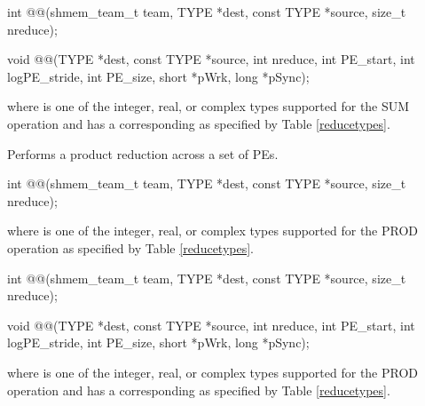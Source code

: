 \begin{apidefinition}
\begin{Csynopsis}
\end{Csynopsis}

\begin{CsynopsisCol}
int @@(shmem_team_t team, TYPE *dest, const TYPE *source, size_t nreduce);
\end{CsynopsisCol}

\begin{DeprecateBlock}
\begin{CsynopsisCol}
void @@(TYPE *dest, const TYPE *source, int nreduce, int PE_start, int logPE_stride, int PE_size, short *pWrk, long *pSync);
\end{CsynopsisCol}
\end{DeprecateBlock}
where \TYPE{} is one of the integer, real, or complex types supported for the SUM operation and has a corresponding \TYPENAME{} as specified by Table \ref{reducetypes}.

Performs a product reduction across a set of \acp{PE}.\newline

\begin{C11synopsis}
int @@(shmem_team_t team, TYPE *dest, const TYPE *source, size_t nreduce);
\end{C11synopsis}
where \TYPE{} is one of the integer, real, or complex types supported for the PROD operation as specified by Table \ref{reducetypes}.

\begin{Csynopsis}
\end{Csynopsis}

\begin{CsynopsisCol}
int @@(shmem_team_t team, TYPE *dest, const TYPE *source, size_t nreduce);
\end{CsynopsisCol}

\begin{DeprecateBlock}
\begin{CsynopsisCol}
void @@(TYPE *dest, const TYPE *source, int nreduce, int PE_start, int logPE_stride, int PE_size, short *pWrk, long *pSync);
\end{CsynopsisCol}
\end{DeprecateBlock}
where \TYPE{} is one of the integer, real, or complex types supported for the PROD operation and has a corresponding \TYPENAME{} as specified by Table \ref{reducetypes}.


\end{apidefinition}
